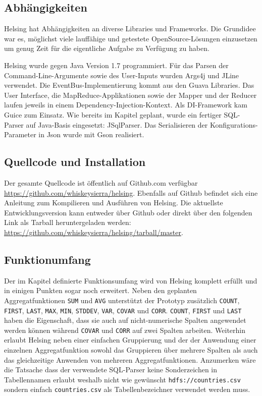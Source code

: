 \documentclass[a4paper]{article}
\begin{document}
\subsection{Abhängigkeiten}
Helsing hat Abhängigkeiten an diverse Libraries und Frameworks. Die Grundidee war es, möglichst viele lauffähige und getestete OpenSource-Lösungen einzusetzen um genug Zeit für die eigentliche Aufgabe zu Verfügung zu haben.

Helsing wurde gegen Java Version 1.7 programmiert. Für das Parsen der Command-Line-Argumente sowie des User-Inputs wurden Args4j\cite{Args4j} und JLine\cite{JLine} verwendet. Die EventBus-Implementierung kommt aus den Guava Libraries\cite{Guava}. Das User Interface, die MapReduce-Applikationen sowie der Mapper und der Reducer laufen jeweils in einem Dependency-Injection-Kontext. Als DI-Framework kam Guice\cite{Guice} zum Einsatz. Wie bereits im Kapitel  geplant, wurde ein fertiger SQL-Parser auf Java-Basis eingesetzt: JSqlParser\cite{JSqlParser}. Das Serialisieren der Konfigurations-Parameter in Json wurde mit Gson\cite{Gson} realisiert.

\subsection{Quellcode und Installation}
Der gesamte Quellcode ist öffentlich auf Github.com verfügbar \url{https://github.com/whiskeysierra/helsing}. Ebenfalls auf Github befindet sich eine Anleitung zum Kompilieren und Ausführen von Helsing. Die aktuellste Entwicklungsversion kann entweder über Github oder direkt über den folgenden Link als Tarball heruntergeladen werden: \url{https://github.com/whiskeysierra/helsing/tarball/master}.

\subsection{Funktionumfang}
Der im Kapitel  definierte Funktionsumfang wird von Helsing komplett erfüllt und in einigen Punkten sogar noch erweitert. Neben den geplanten Aggregatfunktionen \texttt{SUM} und \texttt{AVG} unterstützt der Prototyp zusätzlich \texttt{COUNT}, \texttt{FIRST}, \texttt{LAST}, \texttt{MAX}, \texttt{MIN}, \texttt{STDDEV}, \texttt{VAR}, \texttt{COVAR} und \texttt{CORR}. \texttt{COUNT}, \texttt{FIRST} und \texttt{LAST} haben die Eigenschaft, dass sie auch auf nicht-numerische Spalten angewendet werden können während \texttt{COVAR} und \texttt{CORR} auf zwei Spalten arbeiten.
Weiterhin erlaubt Helsing neben einer einfachen Gruppierung und der der Anwendung einer einzelnen Aggregatfunktion sowohl das Gruppieren über mehrere Spalten als auch das gleichzeitige Anwenden von mehreren Aggregatfunktionen.
Anzumerken wäre die Tatsache dass der verwendete SQL-Parser keine Sonderzeichen in Tabellennamen erlaubt weshalb nicht wie gewünscht \texttt{hdfs://countries.csv} sondern einfach \texttt{countries.csv} als Tabellenbezeichner verwendet werden muss.
\end{document}
